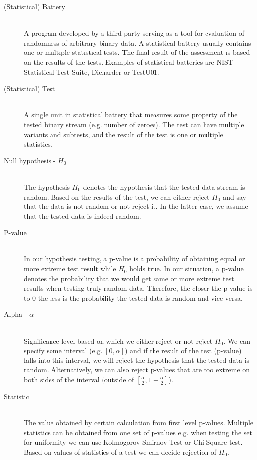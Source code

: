 \documentclass[
  digital,  	%
  color,		%
  oneside,   	%
  12pt,
  nocover,
  notable,
  nolof,
  nolot,
]{fithesis3}
\begin{document}
\begin{description}
\item[(Statistical) Battery] \hfill \\
A program developed by a third party serving as a tool for evaluation of randomness of arbitrary binary data. A statistical battery usually contains one or multiple statistical tests. The final result of the assessment is based on the results of the tests. Examples of statistical batteries are NIST Statistical Test Suite, Dieharder or TestU01.

\item[(Statistical) Test] \hfill \\
A single unit in statistical battery that measures some property of the tested binary stream (e.g. number of zeroes). The test can have multiple variants and subtests, and the result of the test is one or multiple statistics.

\item[Null hypothesis - $H_0$] \hfill \\
The hypothesis $H_0$ denotes the hypothesis that the tested data stream is random. Based on the results of the test, we can either reject $H_0$ and say that the data is not random or not reject it. In the latter case, we assume that the tested data is indeed random.

\item[P-value] \hfill \\
In our hypothesis testing, a p-value is a probability of obtaining equal or more extreme test result while $H_0$ holds true. In our situation, a p-value denotes the probability that we would get same or more extreme test results when testing truly random data. Therefore, the closer the p-value is to 0 the less is the probability the tested data is random and vice versa.

\item[Alpha - $\alpha$] \hfill \\
Significance level based on which we either reject or not reject $H_0$. We can specify some interval (e.g. $[0,\alpha]$) and if the result of the test (p-value) falls into this interval, we will reject the hypothesis that the tested data is random. Alternatively, we can also reject p-values that are too extreme on both sides of the interval (outside of $\left[\frac{\alpha}{2},1-\frac{\alpha}{2}\right]$).

\item[Statistic] \hfill \\
The value obtained by certain calculation from first level p-values. Multiple statistics can be obtained from one set of p-values e.g. when testing the set for uniformity we can use Kolmogorov-Smirnov Test or Chi-Square test. Based on values of statistics of a test we can decide rejection of $H_0$.


\end{description}
\end{document}
